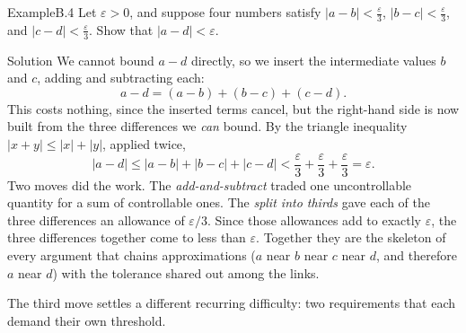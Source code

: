 \documentclass[a4paper,12pt,oneside]{memoir}
\begin{document}
\begin{workedexample}
\begin{envexample}{Example}{B.4}{}
Let \(\varepsilon > 0\), and suppose four numbers satisfy \(|a - b| < \tfrac{\varepsilon}{3}\), \(|b - c| < \tfrac{\varepsilon}{3}\), and \(|c - d| < \tfrac{\varepsilon}{3}\). Show that \(|a - d| < \varepsilon\).
\end{envexample}
\begin{envsolution}{Solution}{}{}
We cannot bound \(a - d\) directly, so we insert the intermediate values \(b\) and \(c\), adding and subtracting each: \[ a - d = (a - b) + (b - c) + (c - d). \] This costs nothing, since the inserted terms cancel, but the right-hand side is now built from the three differences we \emph{can} bound. By the triangle inequality \(|x + y| \le |x| + |y|\), applied twice, \[ |a - d| \le |a - b| + |b - c| + |c - d| < \frac{\varepsilon}{3} + \frac{\varepsilon}{3} + \frac{\varepsilon}{3} = \varepsilon. \] Two moves did the work. The \emph{add-and-subtract} traded one uncontrollable quantity for a sum of controllable ones. The \emph{split into thirds} gave each of the three differences an allowance of \(\varepsilon/3\). Since those allowances add to exactly \(\varepsilon\), the three differences together come to less than \(\varepsilon\). Together they are the skeleton of every argument that chains approximations (\(a\) near \(b\) near \(c\) near \(d\), and therefore \(a\) near \(d\)) with the tolerance shared out among the links.
\end{envsolution}
\end{workedexample}
The third move settles a different recurring difficulty: two requirements that each demand their own threshold.
\end{document}
